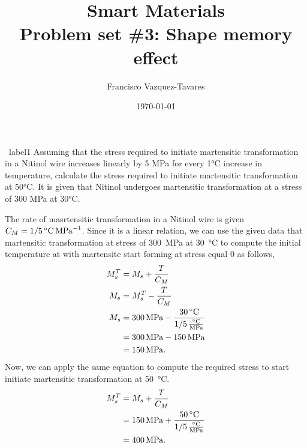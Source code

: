 \documentclass[a4paper]{tufte-handout} %
\title{Smart Materials\\ Problem set \#3: Shape memory effect}
\author{Francisco Vazquez-Tavares}
\date{\today} %
\begin{document}
\maketitle %
\justifying


\begin{prob}{~}{label1}
Assuming that the stress required to initiate martensitic transformation in a Nitinol wire increases linearly by 5 MPa for every 1°C increase in temperature, calculate the stress required to initiate martensitic transformation at 50°C. 
It is given that Nitinol undergoes martensitic transformation at a stress of 300 MPa at 30°C.
\end{prob}

The rate of masrtensitic transformation in a Nitinol wire is given $C_{M}=\SI[quotient-mode=fraction,parse-numbers=false]{1/5}{\degreeCelsius\per\mega\pascal}$.
Since it is a linear relation, we can use the given data that martensitic transformation at stress of \SI{300}{\mega\pascal} at \SI{30}{\degreeCelsius} to compute the initial temperature at with martensite start forming at stress equal $0$ as follows,
\begin{align*}
    M_{s}^T &= M_s + \frac{T}{C_M} \\
    M_s &= M_{s}^T - \frac{T}{C_M} \\
    M_s &= \SI{300}{\mega\pascal} - \frac{\SI{30}{\degreeCelsius}}{\SI[quotient-mode=fraction,parse-numbers=false,per-mode=fraction]{1/5}{\degreeCelsius\per\mega\pascal}} \\
        &= \SI{300}{\mega\pascal} - \SI{150}{\mega\pascal} \\
        &= \SI{150}{\mega\pascal}.
\end{align*}
Now, we can apply the same equation to compute the required stress to start initiate martensitic transformation at \SI{50}{\degreeCelsius}.
\begin{align*}
    M_{s}^T &= M_s + \frac{T}{C_M} \\
            &=\SI{150}{\mega\pascal} + \frac{\SI{50}{\degreeCelsius}}{\SI[quotient-mode=fraction,parse-numbers=false,per-mode=fraction]{1/5}{\degreeCelsius\per\mega\pascal}} \\
            &=\SI{400}{\mega\pascal}.
\end{align*}
\end{document}
